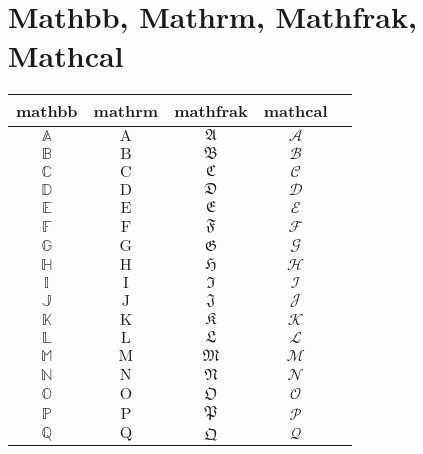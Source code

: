\documentclass{article}
\begin{document}
    \section{Mathbb, Mathrm, Mathfrak, Mathcal}
    \begin{table}[htbp]
        \centering
        \begin{tabular}{@{}ccccc@{}}
        \toprule
        mathbb & mathrm & mathfrak & mathcal &  \\ \midrule
        \( \mathbb{A} \) & \( \mathrm{A} \) & \( \mathfrak{A} \) & \( \mathcal{A} \) &  \\
        \( \mathbb{B} \) & \( \mathrm{B} \) & \( \mathfrak{B} \) & \( \mathcal{B} \) &  \\
        \( \mathbb{C} \) & \( \mathrm{C} \) & \( \mathfrak{C} \) & \( \mathcal{C} \) &  \\
        \( \mathbb{D} \) & \( \mathrm{D} \) & \( \mathfrak{D} \) & \( \mathcal{D} \) &  \\
        \( \mathbb{E} \) & \( \mathrm{E} \) & \( \mathfrak{E} \) & \( \mathcal{E} \) &  \\
        \( \mathbb{F} \) & \( \mathrm{F} \) & \( \mathfrak{F} \) & \( \mathcal{F} \) &  \\
        \( \mathbb{G} \) & \( \mathrm{G} \) & \( \mathfrak{G} \) & \( \mathcal{G} \) &  \\
        \( \mathbb{H} \) & \( \mathrm{H} \) & \( \mathfrak{H} \) & \( \mathcal{H} \) &  \\
        \( \mathbb{I} \) & \( \mathrm{I} \) & \( \mathfrak{I} \) & \( \mathcal{I} \) &  \\
        \( \mathbb{J} \) & \( \mathrm{J} \) & \( \mathfrak{J} \) & \( \mathcal{J} \) &  \\
        \( \mathbb{K} \) & \( \mathrm{K} \) & \( \mathfrak{K} \) & \( \mathcal{K} \) &  \\
        \( \mathbb{L} \) & \( \mathrm{L} \) & \( \mathfrak{L} \) & \( \mathcal{L} \) &  \\
        \( \mathbb{M} \) & \( \mathrm{M} \) & \( \mathfrak{M} \) & \( \mathcal{M} \) &  \\
        \( \mathbb{N} \) & \( \mathrm{N} \) & \( \mathfrak{N} \) & \( \mathcal{N} \) &  \\
        \( \mathbb{O} \) & \( \mathrm{O} \) & \( \mathfrak{O} \) & \( \mathcal{O} \) &  \\
        \( \mathbb{P} \) & \( \mathrm{P} \) & \( \mathfrak{P} \) & \( \mathcal{P} \) &  \\
        \( \mathbb{Q} \) & \( \mathrm{Q} \) & \( \mathfrak{Q} \) & \( \mathcal{Q} \) &  \\

\end{tabular}
\end{table}
\end{document}
